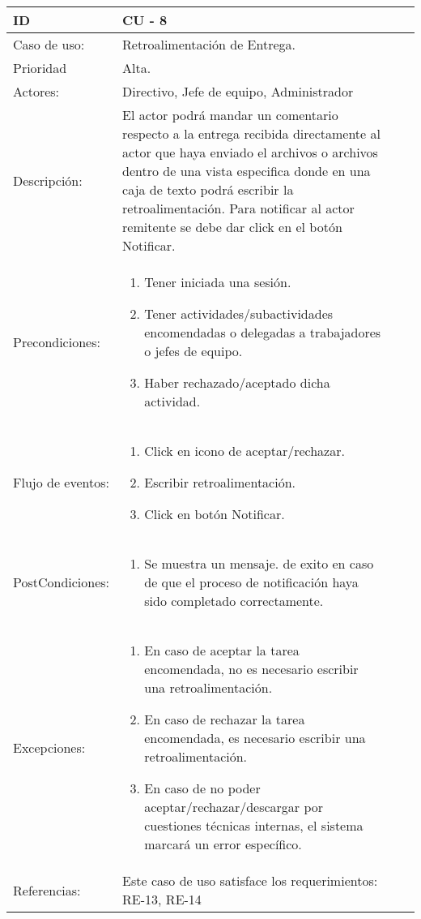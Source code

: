 \documentclass[11pt,a4paper]{article}
\begin{document}
\begin{tabular}[c]{|p{3cm}|p{13cm}|p{2.5cm}|p{3cm}|}
\hline 
\rule[-1ex]{0pt}{2.5ex} ID & CU - 8 \\ 
\hline 
\rule[-1ex]{0pt}{2.5ex} Caso de uso: & Retroalimentación de Entrega.\\ 
\hline 
\rule[-1ex]{0pt}{2.5ex} Prioridad & Alta. \\ 
\hline 
\rule[-1ex]{0pt}{2.5ex} Actores: & Directivo, Jefe de equipo, Administrador\\ 
\hline 
\rule[-1ex]{0pt}{2.5ex} Descripción: & El actor podrá mandar un comentario respecto a la entrega recibida directamente al actor que haya enviado el archivos o archivos dentro de una vista especifica donde en una caja de texto podrá escribir la retroalimentación. Para notificar al actor remitente se debe dar click en el botón Notificar. \\ 
\hline 
\rule[-1ex]{0pt}{2.5ex}Precondiciones: & \begin{enumerate}
\item Tener iniciada una sesión.
\item Tener actividades/subactividades encomendadas o delegadas a trabajadores o jefes de equipo.
\item Haber rechazado/aceptado dicha actividad.
\end{enumerate} \\ 
\hline 
\rule[-1ex]{0pt}{2.5ex} Flujo de eventos: & \begin{enumerate} 
\item Click en icono de aceptar/rechazar.
\item Escribir retroalimentación.
\item Click en botón Notificar.
\end{enumerate}
\\ 
\hline 
\rule[-1ex]{0pt}{2.5ex} PostCondiciones:& \begin{enumerate}  
\item Se muestra un mensaje.
 de exito en caso de que el proceso de notificación haya sido completado correctamente.
\end{enumerate} \\ 
\hline 
\rule[-1ex]{0pt}{2.5ex} Excepciones: & \begin{enumerate} 
\item En caso de aceptar la tarea encomendada, no es necesario escribir una retroalimentación.
\item En caso de rechazar la tarea encomendada, es necesario escribir una retroalimentación.
\item En caso de no poder aceptar/rechazar/descargar por cuestiones técnicas internas, el sistema marcará un error específico.
\end{enumerate} \\ 
\hline 
\rule[-1ex]{0pt}{2.5ex} Referencias: & Este caso de uso satisface los requerimientos: RE-13, RE-14\\
\hline 

\end{tabular} 
\end{document}
